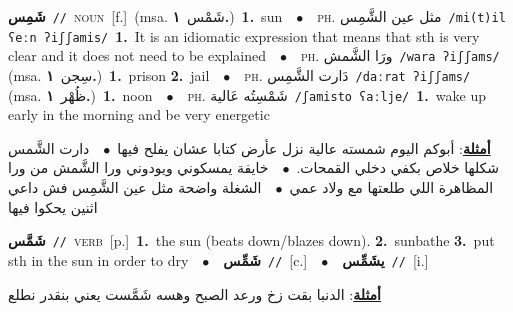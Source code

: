 \documentclass[10pt,a4paper,twoside]{article} %
\begin{document}
\begin{multicols}{2}
{\setlength\topsep{0pt}\textbf{\foreignlanguage{arabic}{شَمِس}}\ {\color{gray}\texttt{//}\color{black}}\ \textsc{noun}\ [f.]\ \color{gray}(msa. \foreignlanguage{arabic}{شَمْس}~\foreignlanguage{arabic}{\textbf{١.}})\color{black}\ \textbf{1.}~sun\ \ $\bullet$\ \ \textsc{ph.} \color{gray} \foreignlanguage{arabic}{مثل عين الشَّمِس}\color{black}\ {\color{gray}\texttt{/{\sffamily mi(t)il ʕeːn ʔiʃʃamis}/}\color{black}}\ \textbf{1.}~It is an idiomatic expression that means that sth is very clear and it does not need to be explained\ \ $\bullet$\ \ \textsc{ph.} \color{gray} \foreignlanguage{arabic}{ورَا الشَّمش}\color{black}\ {\color{gray}\texttt{/{\sffamily wara ʔiʃʃams}/}\color{black}}\ \color{gray} (msa. \foreignlanguage{arabic}{سِجن}~\foreignlanguage{arabic}{\textbf{١.}})\color{black}\ \textbf{1.}~prison  \textbf{2.}~jail\ \ $\bullet$\ \ \textsc{ph.} \color{gray} \foreignlanguage{arabic}{دَارت الشَّمِس}\color{black}\ {\color{gray}\texttt{/{\sffamily daːrat ʔiʃʃams}/}\color{black}}\ \color{gray} (msa. \foreignlanguage{arabic}{ظُهْر}~\foreignlanguage{arabic}{\textbf{١.}})\color{black}\ \textbf{1.}~noon\ \ $\bullet$\ \ \textsc{ph.} \color{gray} \foreignlanguage{arabic}{شَمْسِتُه عَالية}\color{black}\ {\color{gray}\texttt{/{\sffamily ʃamisto ʕaːlje}/}\color{black}}\ \textbf{1.}~wake up early in the morning and be very energetic\  \begin{flushright}\color{gray}\foreignlanguage{arabic}{\textbf{\underline{\foreignlanguage{arabic}{أمثلة}}}: أبوكم اليوم شمسته عالية نزل عأرض كتابا عشان يفلح فيها\ $\bullet$\ \  دارت الشَّمس شكلها خلاص بكفي دخلي القمحات.\ $\bullet$\ \  خايفة يمسكوني ويودوني ورا الشَّمش من ورا المظاهرة اللي طلعتها مع ولاد عمي\ $\bullet$\ \  الشغلة واضحة مثل عين الشَّمِس فش داعي اثنين يحكوا فيها}\end{flushright}\color{black}} \vspace{2mm}

{\setlength\topsep{0pt}\textbf{\foreignlanguage{arabic}{شَمَّس}}\ {\color{gray}\texttt{//}\color{black}}\ \textsc{verb}\ [p.]\ \textbf{1.}~the sun (beats down/blazes down).  \textbf{2.}~sunbathe  \textbf{3.}~put sth in the sun in order to dry\ \ $\bullet$\ \ \setlength\topsep{0pt}\textbf{\foreignlanguage{arabic}{شَمِّس}}\ {\color{gray}\texttt{//}\color{black}}\ [c.]\ \ $\bullet$\ \ \setlength\topsep{0pt}\textbf{\foreignlanguage{arabic}{يشَمِّس}}\ {\color{gray}\texttt{//}\color{black}}\ [i.]\  \begin{flushright}\color{gray}\foreignlanguage{arabic}{\textbf{\underline{\foreignlanguage{arabic}{أمثلة}}}: الدنبا بقت زخ ورعد الصبح وهسه شَمَّست يعني بنقدر نطلع}\end{flushright}\color{black}} \vspace{2mm}


\end{multicols}
\end{document}
